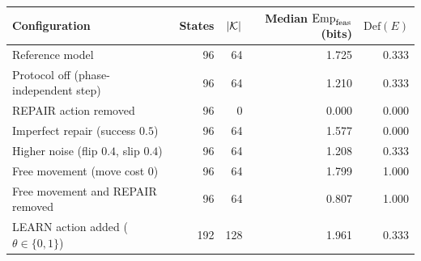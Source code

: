 \begin{tabular}{@{}lrrrr@{}}
\toprule
Configuration & States & $|\mathcal{K}|$ & Median $\mathrm{Emp}_{\mathrm{feas}}$ (bits) & $\mathrm{Def}(E)$ \\
\midrule
Reference model & 96 & 64 & 1.725 & 0.333 \\
\addlinespace
Protocol off (phase-independent step) & 96 & 64 & 1.210 & 0.333 \\
REPAIR action removed & 96 & 0 & 0.000 & 0.000 \\
Imperfect repair (success $0.5$) & 96 & 64 & 1.577 & 0.000 \\
Higher noise (flip $0.4$, slip $0.4$) & 96 & 64 & 1.208 & 0.333 \\
Free movement (move cost $0$) & 96 & 64 & 1.799 & 1.000 \\
Free movement and REPAIR removed & 96 & 64 & 0.807 & 1.000 \\
LEARN action added ($\theta\in\{0,1\}$) & 192 & 128 & 1.961 & 0.333 \\
\bottomrule
\end{tabular}
